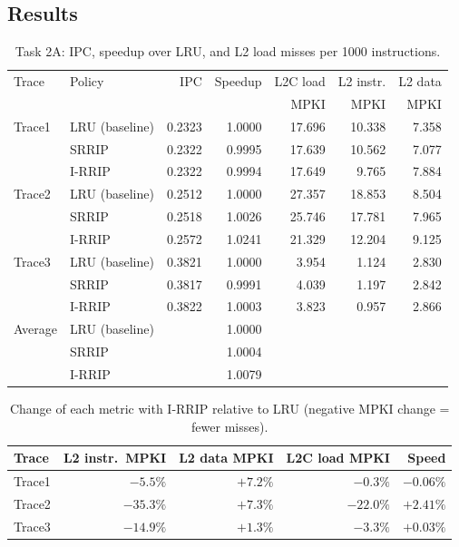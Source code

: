 \documentclass[11pt]{article}
\begin{document}
\subsection{Results}

\begin{table}[H]
\centering
\begin{tabular}{llrrrrr}
\toprule
Trace & Policy & IPC & Speedup & L2C load & L2 instr. & L2 data\\
      &        &     &         & MPKI     & MPKI      & MPKI\\
\midrule
Trace1 & LRU (baseline) & 0.2323 & 1.0000 & 17.696 & 10.338 & 7.358\\
       & SRRIP          & 0.2322 & 0.9995 & 17.639 & 10.562 & 7.077\\
       & I-RRIP         & 0.2322 & 0.9994 & 17.649 &  9.765 & 7.884\\
\midrule
Trace2 & LRU (baseline) & 0.2512 & 1.0000 & 27.357 & 18.853 & 8.504\\
       & SRRIP          & 0.2518 & 1.0026 & 25.746 & 17.781 & 7.965\\
       & I-RRIP         & 0.2572 & 1.0241 & 21.329 & 12.204 & 9.125\\
\midrule
Trace3 & LRU (baseline) & 0.3821 & 1.0000 &  3.954 &  1.124 & 2.830\\
       & SRRIP          & 0.3817 & 0.9991 &  4.039 &  1.197 & 2.842\\
       & I-RRIP         & 0.3822 & 1.0003 &  3.823 &  0.957 & 2.866\\
\midrule
Average & LRU (baseline) & & 1.0000 & & & \\
        & SRRIP          & & 1.0004 & & & \\
        & I-RRIP         & & 1.0079 & & & \\
\bottomrule
\end{tabular}
\caption{Task 2A: IPC, speedup over LRU, and L2 load misses per 1000 instructions.}
\label{tab:t2a-results}
\end{table}

\begin{table}[H]
\centering
\begin{tabular}{lrrrr}
\toprule
Trace & L2 instr.\ MPKI & L2 data MPKI & L2C load MPKI & Speed\\
\midrule
Trace1 &  $-5.5\%$ & $+7.2\%$ &  $-0.3\%$ & $-0.06\%$\\
Trace2 & $-35.3\%$ & $+7.3\%$ & $-22.0\%$ & $+2.41\%$\\
Trace3 & $-14.9\%$ & $+1.3\%$ &  $-3.3\%$ & $+0.03\%$\\
\bottomrule
\end{tabular}
\caption{Change of each metric with I-RRIP relative to LRU (negative MPKI change = fewer misses).}
\label{tab:t2a-delta}
\end{table}
\end{document}
